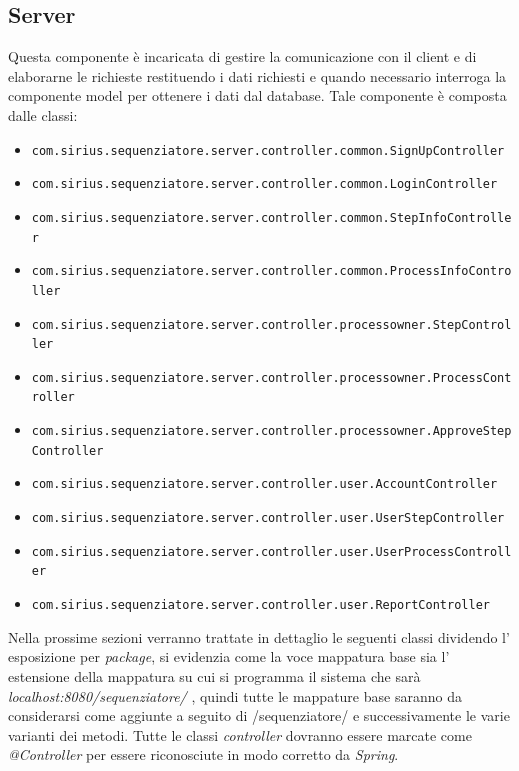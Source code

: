 \subsection{Server}
Questa componente è incaricata di gestire la comunicazione con il client e di elaborarne le richieste restituendo i dati richiesti e quando necessario interroga la componente model per ottenere i dati dal database.
Tale componente è composta dalle classi:
\begin{itemize}
	\item \texttt{com.sirius.sequenziatore.server.controller.common.SignUpController}
	\item \texttt{com.sirius.sequenziatore.server.controller.common.LoginController}
	\item \texttt{com.sirius.sequenziatore.server.controller.common.StepInfoController}
	\item \texttt{com.sirius.sequenziatore.server.controller.common.ProcessInfoController}
	\item \texttt{com.sirius.sequenziatore.server.controller.processowner.StepController}
	\item \texttt{com.sirius.sequenziatore.server.controller.processowner.ProcessController}
	\item \texttt{com.sirius.sequenziatore.server.controller.processowner.ApproveStepController}
	\item \texttt{com.sirius.sequenziatore.server.controller.user.AccountController}
	\item \texttt{com.sirius.sequenziatore.server.controller.user.UserStepController}
	\item \texttt{com.sirius.sequenziatore.server.controller.user.UserProcessController}
	\item \texttt{com.sirius.sequenziatore.server.controller.user.ReportController}
\end{itemize}
Nella prossime sezioni verranno trattate in dettaglio le seguenti classi dividendo l' esposizione per \textit{package}, si evidenzia come la voce mappatura base sia l' estensione della mappatura su cui si programma il sistema che sarà \textit{localhost:8080/sequenziatore/} , quindi tutte le mappature base saranno da considerarsi come aggiunte a seguito di /sequenziatore/ e successivamente le varie varianti dei metodi.
Tutte le classi \textit{controller} dovranno essere marcate come \textit{@Controller} per essere riconosciute in modo corretto da \textit{Spring}.

